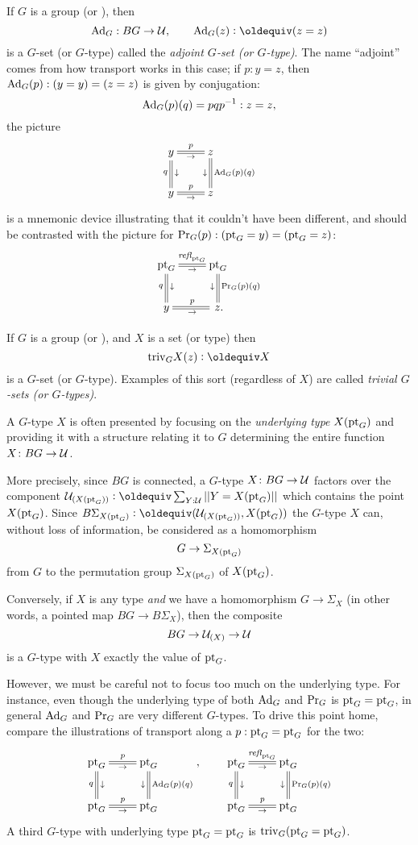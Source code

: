 \begin{example}\label{def:adjointrep}
  If $G$ is a group (or \inftygp), then
$$\Ad_G:BG\to\UU,\qquad\Ad_G(z)\defequi(z=z)$$ is a $G$-set (or $G$-type) called the \emph{adjoint $G$-set (or $G$-type)}.  The name ``adjoint'' comes from how transport works in this case; if $p:y=z$, then $\mathrm{Ad}_G(p):(y=y)=(z=z)$ is given by conjugation: 
$$\mathrm{Ad}_G(p)(q)=pqp^{-1}:z=z,$$ the picture
$$\xymatrix{y\ar@{=}[r]^p_\to\ar@{=}[d]_q^\downarrow&z\ar@{=}[d]^{\Ad_G(p)(q)}_\downarrow\\
y\ar@{=}[r]^p_\to&z}$$
is a mnemonic device illustrating that it couldn't have been different, and should be contrasted with the picture for $\mathrm{Pr}_{{G}} (p):({\mathord{\mathrm{pt}}}_G=y)=({\mathord{\mathrm{pt}}}_G=z)$:
$$\xymatrix{\pt_G\ar@{=}[r]^{\refl{\pt_G}}_\to\ar@{=}[d]_q^\downarrow&\pt_G\ar@{=}[d]^{\princ G(p)(q)}_\downarrow\\
y\ar@{=}[r]^p_\to&\,z.}$$  
\end{example}
\begin{example}\label{def:trivGset}
  If $G$ is a group (or \inftygp), and $X$ is a set (or type) then
$$\mathrm{triv}_GX(z)\defequi X$$ is a $G$-set (or $G$-type).  Examples of this sort (regardless of $X$) are called \emph{trivial $G$-sets (or $G$-types)}.
\end{example}

\begin{remark}
  \label{remark:GsetsareGsets}
  A $G$-type $X$ is often presented by focusing on the \emph{underlying type} $X({\mathord{\mathrm{pt}}}_G)$  and providing it with a structure relating it to $G$ determining the entire function $X\colon BG\to\mathcal{U}$.

More precisely, since $BG$ is connected, a $G$-type $X\colon BG\to\mathcal{U}$ factors over the component $\UU_{(X(\pt_G))}\defequi\sum_{Y:\UU}||Y=X(\pt_G)||$ which contains the point $X({\mathord{\mathrm{pt}}}_G)$.  Since $B\Sigma_{X(\pt_G)}\defequi(\UU_{(X(\pt_G))},X(\pt_G))$ the $G$-type $X$ can, without loss of information, be considered as a homomorphism 
$$G\to\Sigma_{X(\pt_G)}%
$$ from $G$ to the permutation group $\Sigma_{X({\mathord{\mathrm{pt}}}_G)}$ of $X({\mathord{\mathrm{pt}}}_G)$.

Conversely, if $X$ is any type \emph{and} we have a homomorphism $G\to\Sigma_X$ (in other words, a pointed map $BG\to B\Sigma_{X}%
$), then the composite
$$BG\to \mathcal{U}_{(X)}\to \mathcal{U}$$
is a $G$-type with $X$ exactly the value of ${\mathord{\mathrm{pt}}}_G$.

However, we must be careful not to focus too much on the underlying type.  
For instance, even though the underlying type of both $\mathrm{Ad}_G$ and $\mathrm{Pr}_{{G}}$ is ${\mathord{\mathrm{pt}}}_G={\mathord{\mathrm{pt}}}_G$, in general  $\mathrm{Ad}_G$ and $\mathrm{Pr}_{{G}}$  are very different $G$-types.  
To drive this point home, compare the illustrations of transport along a $p:{\mathord{\mathrm{pt}}}_G={\mathord{\mathrm{pt}}}_G$ for the two:
$$\xymatrix{\pt_G\ar@{=}[r]^p_\to\ar@{=}[d]_q^\downarrow&\pt_G\ar@{=}[d]^{\Ad_G(p)(q)}_\downarrow\\
\pt_G\ar@{=}[r]^p_\to&\pt_G},\qquad
\xymatrix{\pt_G\ar@{=}[r]^{\refl{\pt_G}}_\to\ar@{=}[d]_q^\downarrow&\pt_G\ar@{=}[d]^{\princ G(p)(q)}_\downarrow\\
\pt_G\ar@{=}[r]^p_\to&\pt_G}$$
A third $G$-type with underlying type ${\mathord{\mathrm{pt}}}_G={\mathord{\mathrm{pt}}}_G$ is $\mathrm{triv}_G({\mathord{\mathrm{pt}}}_G={\mathord{\mathrm{pt}}}_G)$.
\end{remark}

